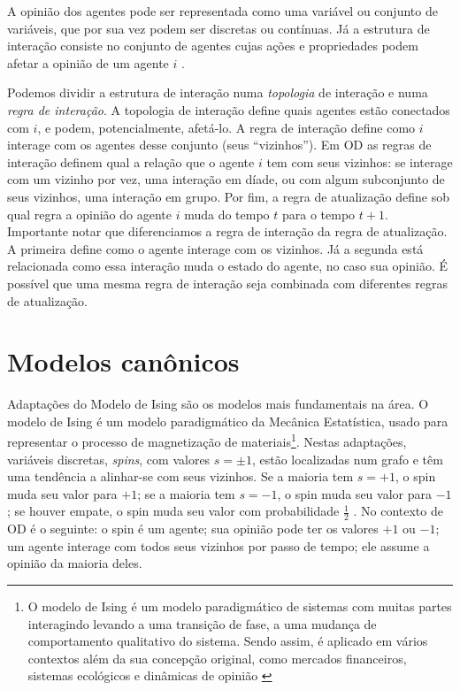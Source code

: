   A opinião dos agentes pode ser representada como uma variável ou conjunto de
  variáveis, que por sua vez podem ser discretas ou contínuas. Já a estrutura de
  interação consiste no conjunto de agentes cujas ações e propriedades podem
  afetar a opinião de um agente \(i\) \cite{page2008uncertainty}.

  Podemos dividir a estrutura de interação numa \textit{topologia} de interação
  e numa \textit{regra de interação}. A topologia de interação define quais
  agentes estão conectados com \(i\), e podem, potencialmente, afetá-lo. A regra
  de interação define como \(i\) interage com os agentes desse conjunto (seus
  ``vizinhos''). Em OD as regras de interação definem qual a relação que o
  agente \(i\) tem com seus vizinhos: se interage com um vizinho por vez, uma
  interação em díade, ou com algum subconjunto de seus vizinhos, uma interação
  em grupo. Por fim, a regra de atualização define sob qual regra a opinião do
  agente \(i\) muda do tempo \(t\) para o tempo \(t+1\). Importante notar que
  diferenciamos a regra de interação da regra de atualização. A primeira define
  como o agente interage com os vizinhos. Já a segunda está relacionada como
  essa interação muda o estado do agente, no caso sua opinião. É possível que
  uma mesma regra de interação seja combinada com diferentes regras de
  atualização.

  
  \section{Modelos canônicos}

  Adaptações do Modelo de Ising são os modelos mais fundamentais na área. O
  modelo de Ising é um modelo paradigmático da Mecânica Estatística, usado para
  representar o processo de magnetização de materiais\footnote{O modelo de Ising
    é um modelo paradigmático de sistemas com muitas partes interagindo levando
    a uma transição de fase, a uma mudança de comportamento qualitativo do
    sistema. Sendo assim, é aplicado em vários contextos além da sua concepção
    original, como mercados financeiros, sistemas ecológicos e dinâmicas de
    opinião \cite{sole2011phase}}. Nestas adaptações, variáveis discretas,
  \textit{spins}, com valores $s = \pm 1$, estão localizadas num grafo e têm uma
  tendência a alinhar-se com seus vizinhos. Se a maioria tem \(s = + 1 \), o
  spin muda seu valor para \(+1\); se a maioria tem \(s = -1 \), o spin muda seu
  valor para \(-1\); se houver empate, o spin muda seu valor com probabilidade
  \(\frac{1}{2}\) \cite{castellano2012social,sole2011phase}. No contexto de OD é
  o seguinte: o spin é um agente; sua opinião pode ter os valores \(+1\) ou
  \(-1\); um agente interage com todos seus vizinhos por passo de tempo; ele
  assume a opinião da maioria deles.

